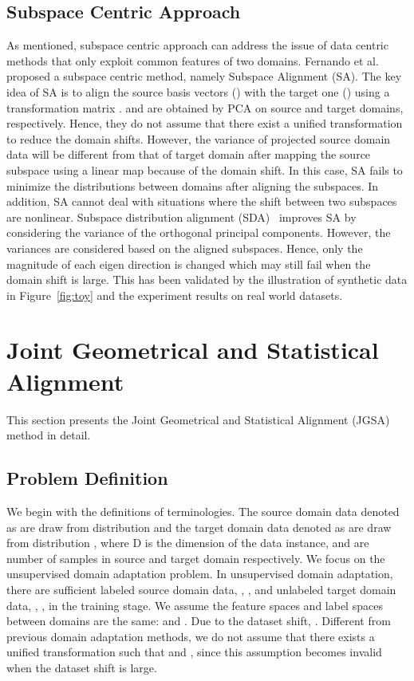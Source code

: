\documentclass[10pt,twocolumn,letterpaper]{article}
\begin{document}
\subsection{Subspace Centric Approach}
As mentioned, subspace centric approach can address the issue of data centric methods that only exploit common features of two domains. Fernando et al.~\cite{Fernando2013} proposed a subspace centric method, namely Subspace Alignment (SA). The key idea of SA is to align the source basis vectors () with the target one () using a transformation matrix .  and  are obtained by PCA on source and target domains, respectively. 
Hence, they do not assume that there exist a unified transformation to reduce the domain shifts.
However, the variance of projected source domain data will be different from that of target domain after mapping the source subspace using a linear map because of the domain shift. In this case, SA fails to minimize the distributions between domains after aligning the subspaces. In addition, SA cannot deal with situations where the shift between two subspaces are nonlinear.
Subspace distribution alignment (SDA)~\cite{Sun2015} improves SA by considering the variance of the orthogonal principal components. However, the variances are considered based on the aligned subspaces. Hence, only the magnitude of each eigen direction is changed which may still fail when the domain shift is large. This has been validated by the illustration of synthetic data in Figure~\ref{fig:toy} and the experiment results on real world datasets. 

\section{Joint Geometrical and Statistical Alignment}
This section presents the Joint Geometrical and Statistical Alignment (JGSA) method in detail.
\subsection{Problem Definition}
We begin with the definitions of terminologies.
The source domain data denoted as  are draw from distribution  and the target domain data denoted as  are draw from distribution , where D is the dimension of the data instance,  and  are number of samples in source and target domain respectively. 
We focus on the unsupervised domain adaptation problem. 
In unsupervised domain adaptation, there are sufficient labeled source domain data, , , and unlabeled target domain data, , , in the training stage. We assume the feature spaces and label spaces between domains are the same:  and .
Due to the dataset shift, . 
Different from previous domain adaptation methods, we do not assume that there exists a unified transformation  such that  and , since this assumption becomes invalid when the dataset shift is large. 
\end{document}

